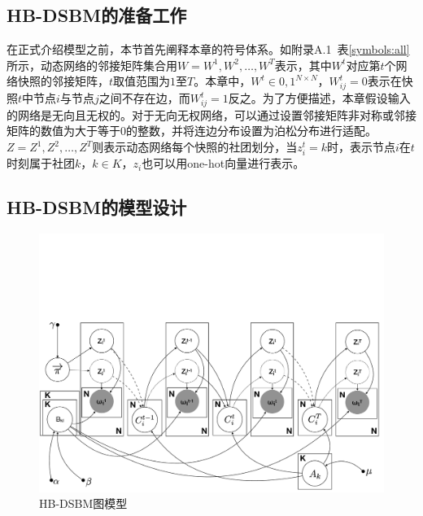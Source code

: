 \subsection{HB-DSBM的准备工作}



在正式介绍模型之前，本节首先阐释本章的符号体系。如附录A.1~表\ref{symbols:all}所示，动态网络的邻接矩阵集合用$W={W^1, W^2, \dots, W^T}$表示，其中$W^t$对应第$t$个网络快照的邻接矩阵，$t$取值范围为$1$至$T$。本章中，$W^t \in {0,1}^{N \times N}$，$W_{ij}^t = 0$表示在快照$t$中节点$i$与节点$j$之间不存在边，而$W_{ij}^t = 1$反之。为了方便描述，本章假设输入的网络是无向且无权的。对于无向无权网络，可以通过设置邻接矩阵非对称或邻接矩阵的数值为大于等于$0$的整数，并将连边分布设置为泊松分布进行适配。$Z = {Z^1, Z^2, \dots, Z^T}$则表示动态网络每个快照的社团划分，当$z_i^t = k$时，表示节点$i$在$t$时刻属于社团$k$，$k \in K$，$z_i$也可以用one-hot向量进行表示。

\subsection{HB-DSBM的模型设计}

\begin{figure}[!htbp]
	\setlength{\abovecaptionskip}{0pt} 
	\setlength{\belowcaptionskip}{10pt} 
	\includegraphics[width=.9\textwidth]{figures/chap04/graph-model_v3_cuted.pdf}
	\caption{HB-DSBM图模型}
	\label{fig.4.1}
\end{figure}

